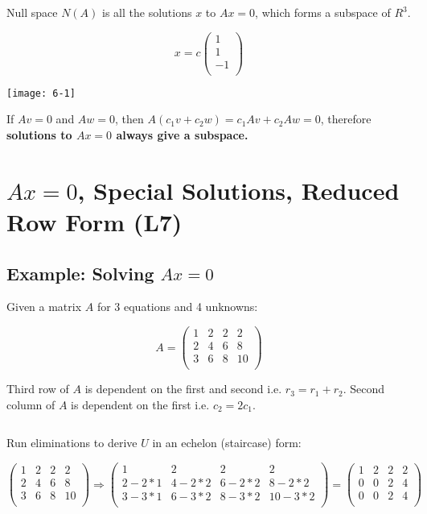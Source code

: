 \documentclass[12pt]{article}
\begin{document}
Null space $N(A)$ is all the solutions $x$ to $Ax=0$, which forms a subspace of $R^3$.

\begin{multicols}{2}
{\[
x=c
\left(
    \begin{matrix}
        1\\ 
        1\\
        -1\\
    \end{matrix}
\right)
\]}

\texttt{[image: 6-1]}
\end{multicols}

If $Av=0$ and $Aw=0$, then $A(c_1v+c_2w)=c_1Av+c_2Aw=0$, therefore \textbf{solutions to $Ax=0$ always give a subspace.}

\newpage

\section{$Ax = 0$, Special Solutions, Reduced Row Form (L7)}

\subsection{Example: Solving $Ax=0$}

Given a matrix $A$ for 3 equations and 4 unknowns:

\[
A=
\left(
    \begin{matrix}
        1 & 2 & 2 & 2\\ 
        2 & 4 & 6 & 8\\
        3 & 6 & 8 & 10\\
    \end{matrix}
\right)
\]

Third row of $A$ is dependent on the first and second i.e. $r_3 = r_1 + r_2$. Second column of $A$ is dependent on the first i.e. $c_2 = 2c_1$.

$\>$

Run eliminations to derive $U$ in an echelon (staircase) form:

\[
\left(
    \begin{matrix}
        \boxed{1} & 2 & 2 & 2\\ 
        2 & 4 & 6 & 8\\
        3 & 6 & 8 & 10\\
    \end{matrix}
\right)
\Rightarrow
\left(
    \begin{matrix}
        \boxed{1} & 2 & 2 & 2\\ 
        2-2*1 & 4-2*2 & 6-2*2 & 8-2*2\\
        3-3*1 & 6-3*2 & 8-3*2 & 10-3*2\\
    \end{matrix}
\right)
=
\left(
    \begin{matrix}
        \boxed{1} & 2 & 2 & 2\\ 
        0 & 0 & 2 & 4\\
        0 & 0 & 2 & 4\\
    \end{matrix}
\right)
\]
\end{document}
